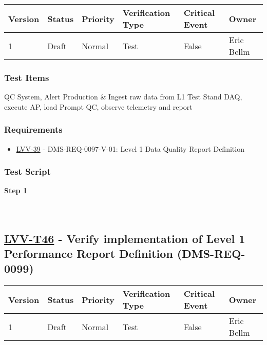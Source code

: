 \begin{longtable}[]{@{}llllll@{}}
\toprule
Version & Status & Priority & Verification Type & Critical Event &
Owner\tabularnewline
\midrule
\endhead
1 & Draft & Normal & Test & False & Eric Bellm\tabularnewline
\bottomrule
\end{longtable}

\hypertarget{test-items-134}{%
\subsubsection{Test Items}\label{test-items-134}}

QC System, Alert Production \& Ingest raw data from L1 Test Stand DAQ,
execute AP, load Prompt QC, observe telemetry and report

\hypertarget{requirements-135}{%
\subsubsection{Requirements}\label{requirements-135}}

\begin{itemize}
\tightlist
\item
  \href{https://jira.lsstcorp.org/browse/LVV-39}{LVV-39} -
  DMS-REQ-0097-V-01: Level 1 Data Quality Report Definition
\end{itemize}

\hypertarget{test-script-135}{%
\subsubsection{Test Script}\label{test-script-135}}

\textbf{Step 1}\\
~\\
~\\

\hypertarget{lvv-t46---verify-implementation-of-level-1-performance-report-definition-dms-req-0099}{%
\subsection{\texorpdfstring{\href{https://jira.lsstcorp.org/secure/Tests.jspa\#/testCase/LVV-T46}{LVV-T46}
- Verify implementation of Level 1 Performance Report Definition
(DMS-REQ-0099)}{LVV-T46 - Verify implementation of Level 1 Performance Report Definition (DMS-REQ-0099)}}\label{lvv-t46---verify-implementation-of-level-1-performance-report-definition-dms-req-0099}}

\begin{longtable}[]{@{}llllll@{}}
\toprule
Version & Status & Priority & Verification Type & Critical Event &
Owner\tabularnewline
\midrule
\endhead
1 & Draft & Normal & Test & False & Eric Bellm\tabularnewline
\bottomrule
\end{longtable}

